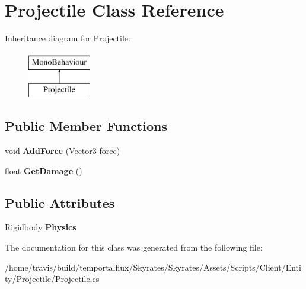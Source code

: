 \hypertarget{class_projectile}{\section{Projectile Class Reference}
\label{class_projectile}
}
Inheritance diagram for Projectile\-:\begin{figure}[H]
\begin{center}
\leavevmode
\includegraphics[height=2.000000cm]{class_projectile}
\end{center}
\end{figure}
\subsection*{Public Member Functions}
\begin{DoxyCompactItemize}
\item 
\hypertarget{class_projectile_afa424c14daec938730b29b108c43b9e0}{void {\bfseries Add\-Force} (Vector3 force)}\label{class_projectile_afa424c14daec938730b29b108c43b9e0}

\item 
\hypertarget{class_projectile_abaa4365575e7be77f8214bf665b0cc50}{float {\bfseries Get\-Damage} ()}\label{class_projectile_abaa4365575e7be77f8214bf665b0cc50}

\end{DoxyCompactItemize}
\subsection*{Public Attributes}
\begin{DoxyCompactItemize}
\item 
\hypertarget{class_projectile_a9b688ac81c5f9a21b63cb3f724962e97}{Rigidbody {\bfseries Physics}}\label{class_projectile_a9b688ac81c5f9a21b63cb3f724962e97}

\end{DoxyCompactItemize}


The documentation for this class was generated from the following file\-:\begin{DoxyCompactItemize}
\item 
/home/travis/build/temportalflux/\-Skyrates/\-Skyrates/\-Assets/\-Scripts/\-Client/\-Entity/\-Projectile/Projectile.\-cs\end{DoxyCompactItemize}
